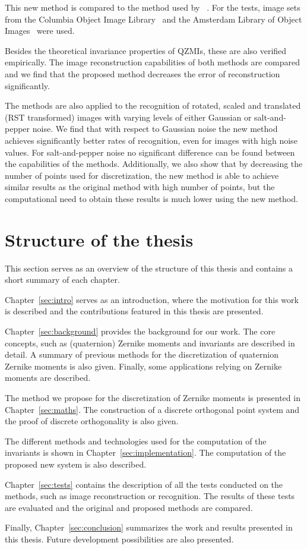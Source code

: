 This new method is compared to the method used by \citeauthor{qzmi}~\cite{qzmi}. For the tests, image sets from the Columbia Object Image Library~\cite{coil} and the Amsterdam Library of Object Images~\cite{aloi} were used. 

Besides the theoretical invariance properties of QZMIs, these are also verified empirically. The image reconstruction capabilities of both methods are compared and we find that the proposed method decreases the error of reconstruction significantly.

The methods are also applied to the recognition of rotated, scaled and translated (RST transformed) images with varying levels of either Gaussian or salt-and-pepper noise. We find that with respect to Gaussian noise the new method achieves significantly better rates of recognition, even for images with high noise values. For salt-and-pepper noise no significant difference can be found between the capabilities of the methods.
Additionally, we also show that by decreasing the number of points used for discretization, the new method is able to achieve similar results as the original method with high number of points, but the computational need to obtain these results is much lower using the new method.


\section{Structure of the thesis}
This section serves as an overview of the structure of this thesis and contains a short summary of each chapter.

Chapter~\ref{sec:intro} serves as an introduction, where the motivation for this work is described and the contributions featured in this thesis are presented.

Chapter~\ref{sec:background} provides the background for our work. The core concepts, such as (quaternion) Zernike moments and invariants are described in detail. A summary of previous methods for the discretization of quaternion Zernike moments is also given. Finally, some applications relying on Zernike moments are described.

The method we propose for the discretization of Zernike moments is presented in Chapter~\ref{sec:maths}. The construction of a discrete orthogonal point system and the proof of discrete orthogonality is also given.

The different methods and technologies used for the computation of the invariants is shown in Chapter~\ref{sec:implementation}. The computation of the proposed new system is also described.

Chapter~\ref{sec:tests} contains the description of all the tests conducted on the methods, such as image reconstruction or recognition. The results of these tests are evaluated and the original and proposed methods are compared.

Finally, Chapter~\ref{sec:conclusion} summarizes the work and results presented in this thesis. Future development possibilities are also presented.